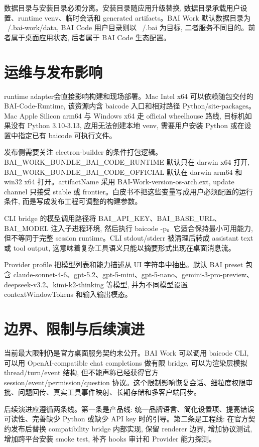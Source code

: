 数据目录与安装目录必须分离。安装目录随应用升级替换, 数据目录承载用户设置、runtime venv、临时会话和 generated artifacts。BAI Work 默认数据目录为 ~/.bai-work/data, BAI Code 用户目录则以 ~/.bai 为目标, 二者服务不同目的。前者属于桌面应用状态, 后者属于 BAI Code 生态配置。

\section{运维与发布影响}
runtime adapter会直接影响构建和现场部署。Mac Intel x64 可以依赖随包交付的 BAI-Code-Runtime, 该资源内含 baicode 入口和相对路径 Python/site-packages。Mac Apple Silicon arm64 与 Windows x64 走 official wheelhouse 路线, 目标机如果没有 Python 3.10-3.13, 应用无法创建本地 venv, 需要用户安装 Python 或在设置中指定已有 baicode 可执行文件。

发布侧需要关注 electron-builder 的条件打包逻辑。BAI\_WORK\_BUNDLE\_BAI\_CODE\_RUNTIME 默认只在 darwin x64 打开, BAI\_WORK\_BUNDLE\_BAI\_CODE\_OFFICIAL 默认在 darwin arm64 和 win32 x64 打开。artifactName 采用 BAI-Work-{version}-{os}-{arch}.{ext}, update channel 只接受 stable 或 frontier。白皮书不把这些变量写成用户必须配置的运行条件, 而是写成发布工程可调整的构建参数。

CLI bridge 的模型调用路径将 BAI\_API\_KEY、BAI\_BASE\_URL、BAI\_MODEL 注入子进程环境, 然后执行 baicode -p。它适合保持最小可用能力, 但不等同于完整 session runtime。CLI stdout/stderr 被清理后转成 assistant text 或 tool output, 这意味着复杂工具语义只能以摘要形式出现在桌面消息流。

Provider profile 把模型列表和能力描述从 UI 字符串中抽出。默认 BAI preset 包含 claude-sonnet-4-6、gpt-5.2、gpt-5-mini、gpt-5-nano、gemini-3-pro-preview、deepseek-v3.2、kimi-k2-thinking 等模型, 并为不同模型设置 contextWindowTokens 和输入输出模态。

\section{边界、限制与后续演进}
当前最大限制仍是官方桌面服务契约未公开。BAI Work 可以调用 baicode CLI, 可以用 OpenAI-compatible chat completions 做有限 bridge, 可以为渲染层模拟 thread/turn/event 结构, 但不能声称已经获得官方 session/event/permission/question 协议。这个限制影响恢复会话、细粒度权限审批、问题回传、真实工具事件映射、长期存储和多客户端同步。

后续演进应遵循两条线。第一条是产品线: 统一品牌语言、简化设置项、提高错误可读性、完善缺少 Python 或缺少 API key 时的引导。第二条是工程线: 在官方契约发布后替换 compatibility bridge 内部实现, 保留 renderer 边界, 增加协议测试, 增加跨平台安装 smoke test, 补齐 hooks 审计和 Provider 能力探测。


